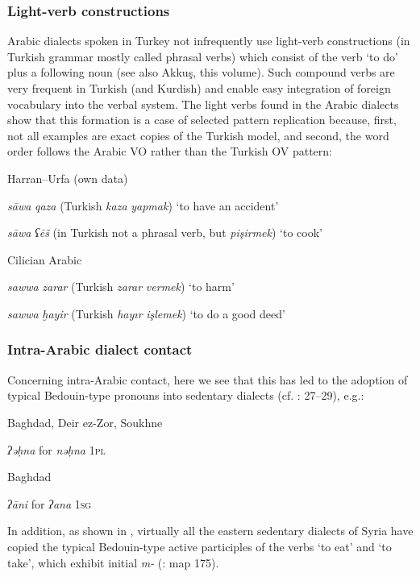 \documentclass[output=paper]{langsci/langscibook}
\begin{document}
\subsubsection{Light-verb constructions}
Arabic dialects spoken in Turkey not infrequently use light-verb constructions (in Turkish grammar mostly called phrasal verbs) which consist of the verb ‘to do’ plus a following noun (see also Akkuş, this volume). Such compound verbs are very frequent in Turkish (and Kurdish) and enable easy integration of foreign vocabulary into the verbal system. The light verbs found in the Arabic dialects show that this formation is a case of selected pattern replication because, first, not all examples are exact copies of the Turkish model, and second, the word order follows the Arabic VO rather than the Turkish OV pattern:

\ea
Harran--Urfa (own data)

\textit{sāwa} \textit{qaza} (Turkish \textit{kaza} \textit{yapmak}) ‘to have an accident’

\textit{sāwa} \textit{ʕēš} (in Turkish not a phrasal verb, but \textit{pişirmek}) ‘to cook’
\z

\ea
Cilician Arabic \citep[198]{Procházka2002Cukurova} 

\textit{sawwa} \textit{zarar} (Turkish \textit{zarar} \textit{vermek}) ‘to harm’

\textit{sawwa} \textit{ḫayir} (Turkish \textit{hayır} \textit{işlemek}) ‘to do a good deed’
\z

\subsubsection{Intra-Arabic dialect contact}
Concerning intra-Arabic contact, here we see that this has led to the adoption of typical Bedouin-type pronouns into sedentary dialects (cf. \citealt{Palva2009}: 27--29), e.g.:

\ea
Baghdad, Deir ez-Zor, Soukhne 

\textit{ʔəḥna} for \textit{nəḥna} \textsc{1pl}
\z

\ea
Baghdad 

\textit{ʔāni} for \textit{ʔana} \textsc{1sg}
\z

In addition, as shown in , virtually all the eastern sedentary dialects of Syria have copied the typical Bedouin-type active participles of the verbs ‘to eat’ and ‘to take’, which exhibit initial \textit{m-} (\citealt{Behnstedt1997}: map 175).
\end{document}
